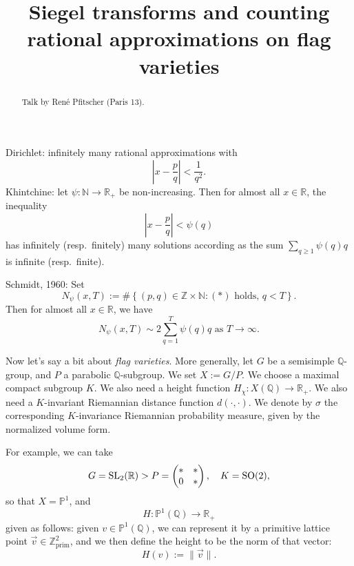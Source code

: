 \documentclass[reqno]{amsart} 
\begin{document}
\title{Siegel transforms and counting rational approximations on flag varieties}

\begin{abstract}
  Talk by Ren\'e Pfitscher (Paris 13).
\end{abstract}

Dirichlet: infinitely many rational approximations with
\begin{equation*}
  \left| x - \frac{p}{q} \right| < \frac{1}{q^2}.
\end{equation*}
Khintchine: let $\psi : \mathbb{N} \rightarrow \mathbb{R}_+$ be non-increasing.  Then for almost all $x \in \mathbb{R}$, the inequality
\begin{equation*}
  \left| x - \frac{p}{q} \right| < \psi(q)
\end{equation*}
has infinitely (resp.\ finitely) many solutions according as the sum $\sum_{q \geq 1} \psi(q) q$ is infinite (resp.\ finite).

Schmidt, 1960: Set
\begin{equation*}
  N_\psi(x, T) := \# \left\{(p, q) \in \mathbb{Z} \times \mathbb{N} :(\ast) \text{ holds, } q < T \right\}.
\end{equation*}
Then for almost all $x \in \mathbb{R}$, we have
\begin{equation*}
  N_\psi(x, T) \sim 2 \sum_{q = 1}^T \psi(q) q \text{ as } T \rightarrow \infty.
\end{equation*}

Now let's say a bit about \emph{flag varieties}.  More generally, let $G$ be a semisimple $\mathbb{Q}$-group, and $P$ a parabolic $\mathbb{Q}$-subgroup.  We set $X := G / P$.  We choose a maximal compact subgroup $K$.  We also need a height function $H_\chi : X(\mathbb{Q}) \rightarrow \mathbb{R}_+$.  We also need a $K$-invariant Riemannian distance function $d(\cdot, \cdot)$.  We denote by $\sigma$ the corresponding $K$-invariance Riemannian probability measure, given by the normalized volume form.

For example, we can take
\begin{equation*}
  G = \operatorname{SL}_2(\mathbb{R}) > P =
  \begin{pmatrix}
    \ast    & \ast \\
    0         & \ast \\
  \end{pmatrix}, \quad
  K = \operatorname{SO}(2),
\end{equation*}
so that $X = \mathbb{P}^1$, and
\begin{equation*}
  H : \mathbb{P}^1(\mathbb{Q}) \rightarrow \mathbb{R}_+
\end{equation*}
given as follows: given $v \in \mathbb{P}^1(\mathbb{Q})$, we can represent it by a primitive lattice point $\vec{v} \in \mathbb{Z}^2_{\mathrm{prim}}$, and we then define the height to be the norm of that vector:
\begin{equation*}
  H(v) := \lVert \vec{v} \rVert.
\end{equation*}
\end{document}
